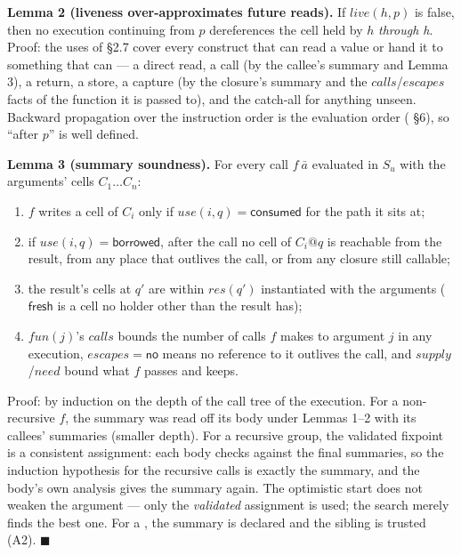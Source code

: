 \textbf{Lemma 2 (liveness over-approximates future reads).} If $\mathit{live}(h,\allowbreak{}p)$ is false, then no execution continuing from $p$ dereferences the cell held by $h$ \emph{through h}. Proof: the uses of §2.7 cover every construct that can read a value or hand it to something that can — a direct read, a call (by the callee's summary and Lemma 3), a return, a store, a capture (by the closure's summary and the $\mathit{calls}$/$\mathit{escapes}$ facts of the function it is passed to), and the catch-all for anything unseen. Backward propagation over the instruction order is the evaluation order ( §6), so “after $p$” is well defined.

\textbf{Lemma 3 (summary soundness).} For every call $f\ \bar{a}$ evaluated in $S_{u}$ with the arguments' cells $C_{1}\ldots C_{n}$:

\begin{enumerate}
\item $f$ writes a cell of $C_{i}$ only if $\mathit{use}(i,\allowbreak{}q)=\mathsf{consumed}$ for the path it sits at;
\item if $\mathit{use}(i,\allowbreak{}q)=\mathsf{borrowed}$, after the call no cell of $C_{i}@q$ is reachable from the result, from any place that outlives the call, or from any closure still callable;
\item the result's cells at $q'$ are within $\mathit{res}(q')$ instantiated with the arguments ($\mathsf{fresh}$ is a cell no holder other than the result has);
\item $\mathit{fun}(j)$'s $\mathit{calls}$ bounds the number of calls $f$ makes to argument $j$ in any execution, $\mathit{escapes}=\mathsf{no}$ means no reference to it outlives the call, and $\mathit{supply}$/$\mathit{need}$ bound what $f$ passes and keeps.
\end{enumerate}

Proof: by induction on the depth of the call tree of the execution. For a non-recursive $f$, the summary was read off its body under Lemmas 1–2 with its callees' summaries (smaller depth). For a recursive group, the validated fixpoint is a consistent assignment: each body checks against the final summaries, so the induction hypothesis for the recursive calls is exactly the summary, and the body's own analysis gives the summary again. The optimistic start does not weaken the argument — only the \emph{validated} assignment is used; the search merely finds the best one. For a , the summary is declared and the sibling is trusted (A2). $\blacksquare$

